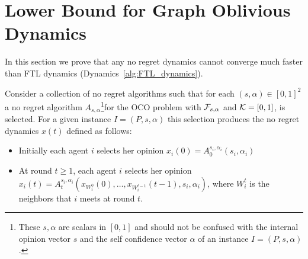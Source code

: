 \section{Lower Bound for Graph Oblivious Dynamics}\label{s:lower_bound}
In this section we prove that any no regret dynamics cannot converge much
faster than FTL dynamics (Dynamics~\ref{alg:FTL_dynamics}). %

\begin{definition}
Consider a collection of no regret algorithms such that
for each $(s,\alpha) \in [0,1]^2$ a
no regret algorithm
$A_{s,\alpha}$\footnote{
These $s,\alpha$ are scalars in $[0,1]$ and
should not be confused with the internal opinion vector $s$
and the self confidence vector $\alpha$ of an instance $I=(P,s,\alpha)$.}for the OCO problem with
$\mathcal{F}_{s,\alpha}$ and $\mathcal{K}=[0,1]$, is selected. For a given instance $I=(P,s,\alpha)$
this selection produces the no regret dynamics $x(t)$ defined as follows:
\begin{itemize}
 \item Initially each agent $i$ selects her opinion $x_i(0)=A_0^{s_i,\alpha_i}(s_i,\alpha_i)$
 \item At round $t\geq 1$, each agent $i$ selects her opinion
   \(x_i(t)=A_t^{s_i,\alpha_i}(x_{W_i^0}(0),\dots,x_{W_i^{t-1}}(t-1),s_i,\alpha_i)\),
where $W_i^t$ is the neighbors that $i$ meets at round $t$.
\end{itemize}
\end{definition}

